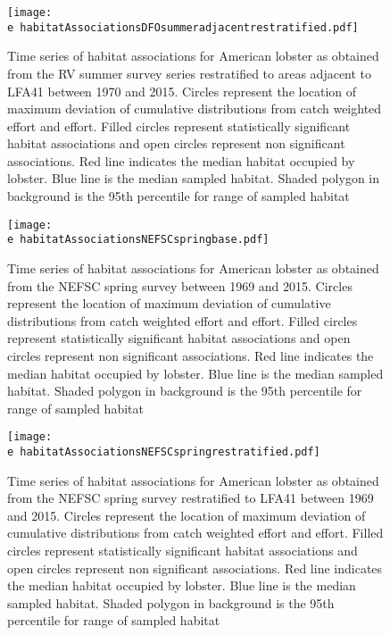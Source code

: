 \documentclass[11pt]{article}
\newcommand{\e}{/backup/bio_data/bio.lobster/figures/} %
\begin{document}
\begin{figure}

    \texttt{[image: \\e habitatAssociationsDFOsummeradjacentrestratified.pdf]}
    \caption{Time series of habitat associations for American lobster as obtained from the RV summer survey series restratified to areas adjacent to LFA41 between 1970 and 2015. Circles represent the location of maximum deviation of cumulative distributions from catch weighted effort and effort. Filled circles represent statistically significant habitat associations and open circles represent non significant associations. Red line indicates
the median habitat occupied by lobster. Blue line is the median sampled habitat. Shaded polygon in background is the 95th percentile for range of sampled habitat}

\end{figure}



\begin{figure}

    \texttt{[image: \\e habitatAssociationsNEFSCspringbase.pdf]}
    \caption{Time series of habitat associations for American lobster as obtained from the NEFSC spring survey between 1969 and 2015. Circles represent the location of maximum deviation of cumulative distributions from catch weighted effort and effort. Filled circles represent statistically significant habitat associations and open circles represent non significant associations. Red line indicates
the median habitat occupied by lobster. Blue line is the median sampled habitat. Shaded polygon in background is the 95th percentile for range of sampled habitat}

\end{figure}



\begin{figure}

    \texttt{[image: \\e habitatAssociationsNEFSCspringrestratified.pdf]}
    \caption{Time series of habitat associations for American lobster as obtained from the NEFSC spring survey restratified to LFA41 between 1969 and 2015. Circles represent the location of maximum deviation of cumulative distributions from catch weighted effort and effort. Filled circles represent statistically significant habitat associations and open circles represent non significant associations. Red line indicates the median habitat occupied by lobster. Blue line is the median sampled habitat. Shaded polygon in background is the 95th percentile for range of sampled habitat}

\end{figure}
\end{document}
